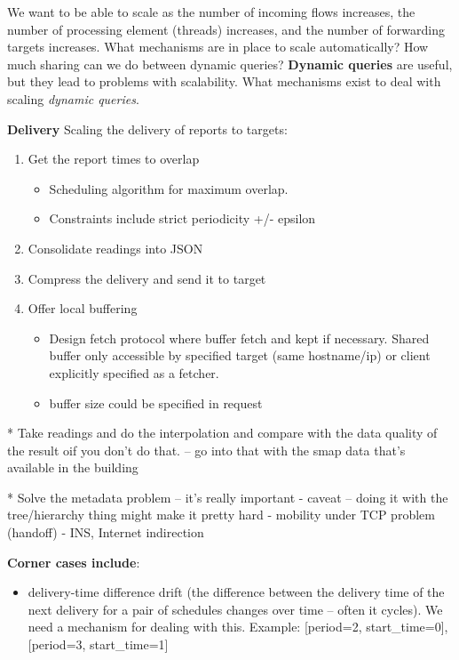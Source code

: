 We want to be able to scale as the number of incoming flows increases, the number of processing element (threads) increases, and the number of forwarding
targets increases.  What mechanisms are in place to scale automatically?  How much sharing can we do between dynamic queries? {\bf Dynamic queries} are
useful, but they lead to problems with scalability.  What mechanisms exist to deal with scaling \emph{dynamic queries}.

{\bf Delivery} Scaling the delivery of reports to targets:
\begin{enumerate}
\item Get the report times to overlap
	\begin{itemize}
	\item Scheduling algorithm for maximum overlap.
	\item Constraints include strict periodicity +/- epsilon
	\end{itemize}
\item Consolidate readings into JSON
\item Compress the delivery and send it to target
\item Offer local buffering
	\begin{itemize}
	\item Design fetch protocol where buffer fetch and kept if necessary.  Shared buffer only accessible by specified target (same hostname/ip)
		or client explicitly specified as a fetcher.
	\item buffer size could be specified in request
	\end{itemize}
\end{enumerate}

* Take readings and do the interpolation and compare with the data quality of the result oif you don't do that. -- go into that with the smap 
data that's available in the building

* Solve the metadata problem -- it's really important
	- caveat -- doing it with the tree/hierarchy thing might make it pretty hard
	- mobility under TCP problem (handoff)
	- INS, Internet indirection
	
{\bf Corner cases include}:
\begin{itemize}
\item delivery-time difference drift (the difference between the delivery time of the next 
	delivery for a pair of schedules changes over time -- often it cycles).  We need a mechanism for dealing
	with this.  Example:  [period=2, start\_time=0], [period=3, start\_time=1]
\end{itemize}


